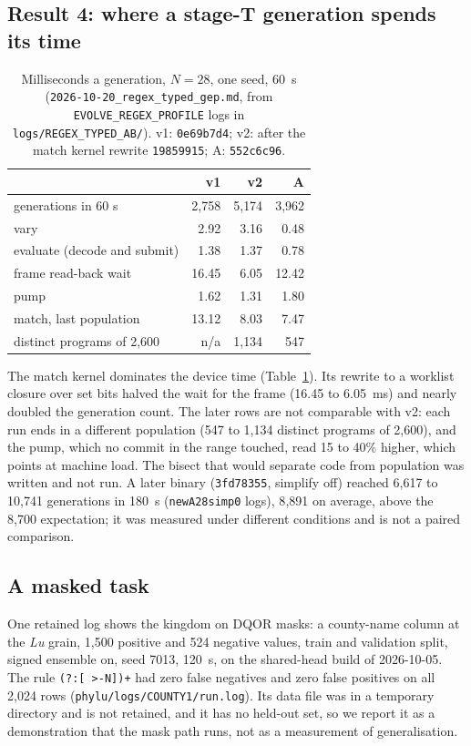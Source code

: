 \documentclass[sigconf,nonacm]{acmart}
\newcommand{\rx}{\lstinline[style=mono]}
\newcommand{\src}[1]{{\small\nolinkurl{#1}}}
\begin{document}
\subsection{Result 4: where a stage-T generation spends its time}

\begin{table}[t]
\caption{Milliseconds a generation, $N=28$, one seed, 60~s
(\src{2026-10-20_regex_typed_gep.md}, from \src{EVOLVE_REGEX_PROFILE} logs
in \src{logs/REGEX_TYPED_AB/}). v1: \texttt{0e69b7d4}; v2: after the match
kernel rewrite \texttt{19859915}; A: \texttt{552c6c96}.}
\label{tab:profile}
\small
\begin{tabular}{@{}lrrr@{}}
\toprule
 & v1 & v2 & A \\
\midrule
generations in 60 s & 2{,}758 & 5{,}174 & 3{,}962 \\
vary & 2.92 & 3.16 & 0.48 \\
evaluate (decode and submit) & 1.38 & 1.37 & 0.78 \\
frame read-back wait & 16.45 & 6.05 & 12.42 \\
pump & 1.62 & 1.31 & 1.80 \\
match, last population & 13.12 & 8.03 & 7.47 \\
distinct programs of 2{,}600 & n/a & 1{,}134 & 547 \\
\bottomrule
\end{tabular}
\end{table}

The match kernel dominates the device time (Table~\ref{tab:profile}). Its
rewrite to a worklist closure over set bits halved the wait for the frame (16.45
to 6.05~ms) and nearly doubled the generation count. The later rows are not
comparable with v2: each run ends in a different population (547 to 1{,}134
distinct programs of 2{,}600), and the pump, which no commit in the range touched,
read 15 to 40\% higher, which points at machine load. The bisect that would
separate code from population was written and not run. A later binary
(\texttt{3fd78355}, simplify off) reached 6{,}617 to 10{,}741 generations in
180~s (\texttt{newA28simp0} logs), 8{,}891 on average, above the 8{,}700
expectation; it was measured under different conditions and is not a
paired comparison.

\subsection{A masked task}

One retained log shows the kingdom on DQOR masks: a county-name column at the
\emph{Lu} grain, 1{,}500 positive and 524 negative values, train and validation
split, signed ensemble on, seed 7013, 120~s, on the shared-head build of
2026-10-05. The rule \rx!(?:[ >-N])+! had zero false negatives and zero false
positives on all 2{,}024 rows (\src{phylu/logs/COUNTY1/run.log}). Its data file
was in a temporary directory and is not retained, and it has no held-out set, so
we report it as a demonstration that the mask path runs, not as a measurement of
generalisation.
\end{document}
